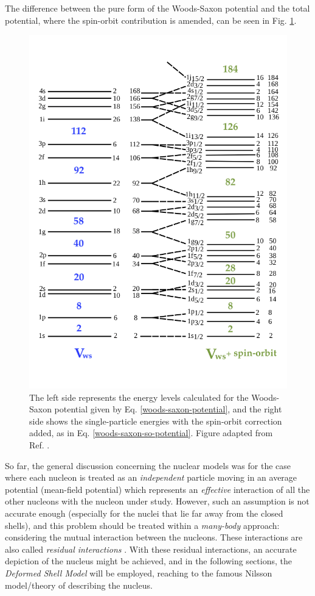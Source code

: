 The difference between the pure form of the Woods-Saxon potential and the total potential, where the spin-orbit contribution is amended, can be seen in Fig. \ref{woods-saxon-energy-levels}.
\begin{figure}
    \centering
    \includegraphics[scale=0.46]{Chapters/Figures/energy_levels_WS.png}
    \caption{The left side represents the energy levels calculated for the Woods-Saxon potential given by Eq. \ref{woods-saxon-potential}, and the right side shows the single-particle energies with the spin-orbit correction added, as in Eq. \ref{woods-saxon-so-potential}. Figure adapted from Ref. \cite{lewis2019lifetime}.}
    \label{woods-saxon-energy-levels}
\end{figure}

So far, the general discussion concerning the nuclear models was for the case where each nucleon is treated as an \emph{independent} particle moving in an average potential (mean-field potential) which represents an \emph{effective} interaction of all the other nucleons with the nucleon under study. However, such an assumption is not accurate enough (especially for the nuclei that lie far away from the closed shells), and this problem should be treated within a \emph{many-body} approach: considering the mutual interaction between the nucleons. These interactions are also called \emph{residual interactions} \cite{casten2000nuclear,bertulani2007nuclear}. With these residual interactions, an accurate depiction of the nucleus might be achieved, and in the following sections, the \emph{Deformed Shell Model} will be employed, reaching to the famous Nilsson model/theory of describing the nucleus.

